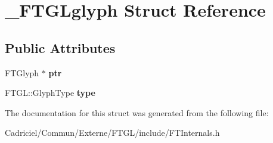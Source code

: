 \hypertarget{struct___f_t_g_lglyph}{}\section{\+\_\+\+F\+T\+G\+Lglyph Struct Reference}
\label{struct___f_t_g_lglyph}
\subsection*{Public Attributes}
\begin{DoxyCompactItemize}
\item 
F\+T\+Glyph $\ast$ {\bfseries ptr}\hypertarget{struct___f_t_g_lglyph_a6bd6880c871ebdc4f78f15f698e8421b}{}\label{struct___f_t_g_lglyph_a6bd6880c871ebdc4f78f15f698e8421b}

\item 
F\+T\+G\+L\+::\+Glyph\+Type {\bfseries type}\hypertarget{struct___f_t_g_lglyph_aa5d5991a60bfba8ee2a8f850553675b8}{}\label{struct___f_t_g_lglyph_aa5d5991a60bfba8ee2a8f850553675b8}

\end{DoxyCompactItemize}


The documentation for this struct was generated from the following file\+:\begin{DoxyCompactItemize}
\item 
Cadriciel/\+Commun/\+Externe/\+F\+T\+G\+L/include/F\+T\+Internals.\+h\end{DoxyCompactItemize}
